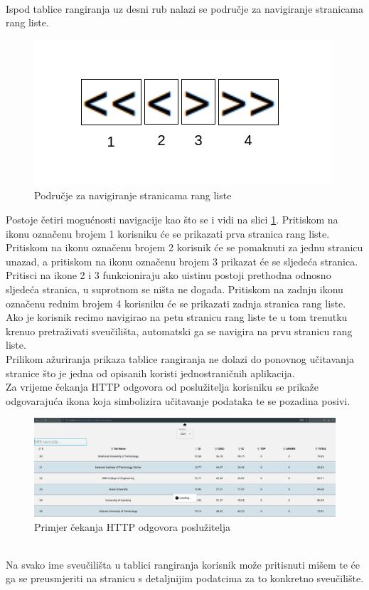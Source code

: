 \documentclass[times, utf8, zavrsni]{fer}
\begin{document}
\\Ispod tablice rangiranja uz desni rub nalazi se područje za navigiranje stranicama rang liste.       
\begin{figure}[htb]
    \centering
       \includegraphics[scale=0.4]{navigiranje.png} 
       \caption{Područje za navigiranje stranicama rang liste}
       \label{fig:navigacija}
       \end{figure}
Postoje četiri mogućnosti navigacije kao što se i vidi na slici \ref{fig:navigacija}. Pritiskom na ikonu označenu brojem 1 korisniku će se prikazati prva stranica rang liste.
Pritiskom na ikonu označenu brojem 2 korisnik će se pomaknuti za jednu stranicu unazad, a pritiskom na ikonu označenu brojem 3 prikazat će se sljedeća stranica. 
Pritisci na ikone 2 i 3 funkcioniraju ako uistinu postoji prethodna odnosno sljedeća stranica, u suprotnom se ništa ne događa.
Pritiskom na zadnju ikonu označenu rednim brojem 4 korisniku će se prikazati zadnja stranica rang liste. 
\\Ako je korisnik recimo navigirao na petu stranicu rang liste te u tom trenutku krenuo pretraživati sveučilišta, automatski ga se navigira na prvu stranicu rang liste.
\\Prilikom ažuriranja prikaza tablice rangiranja ne dolazi do ponovnog učitavanja stranice što je jedna od opisanih koristi jednostraničnih aplikacija.
\\Za vrijeme čekanja HTTP odgovora od poslužitelja korisniku se prikaže \\odgovarajuća ikona koja simbolizira učitavanje podataka te se pozadina posivi.
\begin{figure}[htb]
    \hspace*{-2cm}  
       \includegraphics[scale=0.21]{loading.png} 
       \caption{Primjer čekanja HTTP odgovora poslužitelja}
       \label{fig:sort2}
       \end{figure}
\\Na svako ime sveučilišta u tablici rangiranja korisnik može pritisnuti mišem te će ga se preusmjeriti na stranicu s detaljnijim podatcima za to konkretno sveučilište.
\end{document}
